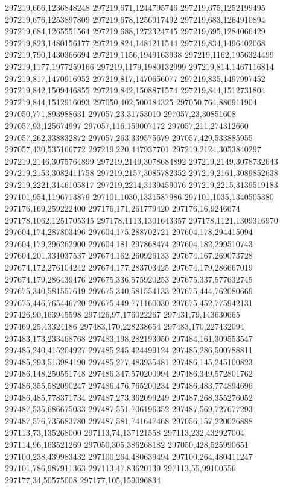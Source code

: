 297219,666,1236848248
297219,671,1244795746
297219,675,1252199495
297219,676,1253897809
297219,678,1256917492
297219,683,1264910894
297219,684,1265551564
297219,688,1272324745
297219,695,1284066429
297219,823,1480156177
297219,824,1481211544
297219,834,1496402068
297219,790,1430366694
297219,1156,1949163938
297219,1162,1956324499
297219,1177,1977259166
297219,1179,1980132999
297219,814,1467116814
297219,817,1470916952
297219,817,1470656077
297219,835,1497997452
297219,842,1509446855
297219,842,1508871574
297219,844,1512731804
297219,844,1512916093
297050,402,500184325
297050,764,886911904
297050,771,893988631
297057,23,31753010
297057,23,30851608
297057,93,125674997
297057,116,159007172
297057,211,274312660
297057,262,338832872
297057,263,339575679
297057,429,533885955
297057,430,535166772
297219,220,447937701
297219,2124,3053840297
297219,2146,3075764899
297219,2149,3078684892
297219,2149,3078732643
297219,2153,3082411758
297219,2157,3085782352
297219,2161,3089852638
297219,2221,3146105817
297219,2214,3139459076
297219,2215,3139519183
297101,954,1196713879
297101,1030,1331587986
297101,1035,1340505380
297176,169,259222400
297176,171,261779420
297176,16,9246674
297178,1062,1251705345
297178,1113,1301643357
297178,1121,1309316970
297604,174,287803496
297604,175,288702721
297604,178,294415094
297604,179,296262900
297604,181,297868474
297604,182,299510743
297604,201,331037537
297674,162,260926133
297674,167,269073728
297674,172,276104242
297674,177,283703425
297674,179,286667019
297674,179,286439476
297675,336,575920253
297675,337,577632745
297675,340,581557619
297675,340,581554133
297675,444,762080669
297675,446,765446720
297675,449,771160030
297675,452,775942131
297426,90,163945598
297426,97,176022267
297431,79,143630665
297469,25,43324186
297483,170,228238654
297483,170,227432094
297483,173,233468768
297483,198,282193050
297484,161,309553547
297485,240,415204927
297485,245,424499124
297485,286,500788811
297485,293,513984190
297485,277,483935481
297486,145,245100823
297486,148,250551748
297486,347,570200994
297486,349,572801762
297486,355,582090247
297486,476,765200234
297486,483,774894696
297486,485,778371734
297487,273,362099249
297487,268,355276052
297487,535,686675033
297487,551,706196352
297487,569,727677293
297487,576,735683780
297487,581,741647468
297056,157,220026888
297113,73,135268000
297113,74,137121558
297113,232,432927004
297114,96,163521269
297050,305,386268182
297050,428,525990651
297100,238,439983432
297100,264,480639494
297100,264,480411247
297101,786,987911363
297113,47,83620139
297113,55,99100556
297177,34,50575008
297177,105,159096834

